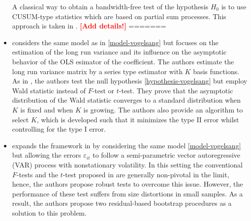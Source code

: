 \documentclass[a4paper,12pt]{article}
\begin{document}
\begin{itemize}[label=--,leftmargin=0.5cm]
A classical way to obtain a bandwidth-free test of the hypothesis $H_0$ is to use CUSUM-type statistics which are based on partial sum processes. This approach is taken in \cite{Hidalgo2014}. \textcolor{red}{\textbf{[Add details!]}}
=======
\item \cite{Sun2011} considers the same model as in \eqref{model-vogelsang} but focuses on the estimation of the long run variance and its influence on the asymptotic behavior of the OLS esimator of the coefficient. The authors estimate the long run variance matrix by a series type estimator with $K$ basis functions. As in \cite*{Vogelsang2005}, the authors test the null hypothesis \eqref{hypothesis-vogelsang} but employ Wald statistic instead of $F$-test or $t$-test. They prove that the asymptotic distribution of the Wald statistic converges to a standard distribution when $K$ is fixed and when $K$ is growing. The authors also provide an algorithm to select $K$, which is developed such that it minimizes the type II error whilst controlling for the type I error.

\item \cite{Xu2012} expands the framework in \cite*{Vogelsang2005} by considering the same model \eqref{model-vogelsang} but allowing the errors $\varepsilon_{it}$ to follow a semi-parametric vector autoregressive (VAR) process with nonstationary volatility. In this setting the conventional $F$-tests and the $t$-test proposed in \cite*{Vogelsang2005} are generally non-pivotal in the limit, hence, the authors propose robust tests to overcome this issue. However, the performance of these test suffers from size distortions in small samples. As a result, the authors propose two residual-based bootstrap procedures as a solution to this problem.


\end{itemize}
\end{document}
